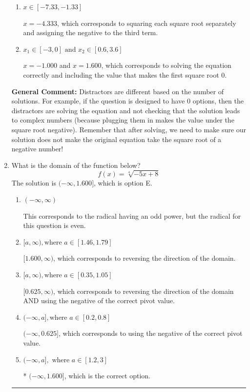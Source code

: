 \documentclass{extbook}[14pt]
\newcommand{\litem}[1]{\item #1

\rule{\textwidth}{0.4pt}}
\begin{document}
\begin{enumerate}
{\begin{enumerate}[label=\Alph*.]
$x = 0.625$ and $x = 1.600$, which corresponds to solving each radical separately for 0.
\item \( x \in [-7.33,-1.33] \)

$x = -4.333$, which corresponds to squaring each square root separately and assigning the negative to the third term.
\item \( x_1 \in [-3, 0] \text{ and } x_2 \in [0.6,3.6] \)

$x = -1.000$ and $x = 1.600$, which corresponds to solving the equation correctly and including the value that makes the first square root 0.
\end{enumerate}

\textbf{General Comment:} Distractors are different based on the number of solutions. For example, if the question is designed to have 0 options, then the distractors are solving the equation and not checking that the solution leads to complex numbers (because plugging them in makes the value under the square root negative). Remember that after solving, we need to make sure our solution does not make the original equation take the square root of a negative number!
}
\litem{
What is the domain of the function below?
\[ f(x) = \sqrt[4]{-5 x + 8} \]The solution is \( (-\infty, 1.600] \), which is option E.\begin{enumerate}[label=\Alph*.]
\item \( (-\infty, \infty) \)

This corresponds to the radical having an odd power, but the radical for this question is even.
\item \( [a, \infty), \text{where } a \in [1.46, 1.79] \)

 $[1.600, \infty)$, which corresponds to reversing the direction of the domain.
\item \( [a, \infty), \text{where } a \in [0.35, 1.05] \)

$[0.625, \infty)$, which corresponds to reversing the direction of the domain AND using the negative of the correct pivot value.
\item \( (-\infty, a], \text{where } a \in [0.2, 0.8] \)

$(-\infty, 0.625]$, which corresponds to using the negative of the correct pivot value.
\item \( (-\infty, a], \text{ where } a \in [1.2, 3] \)

* $(-\infty, 1.600]$, which is the correct option.
\end{enumerate}

}
\end{enumerate}
\end{document}
